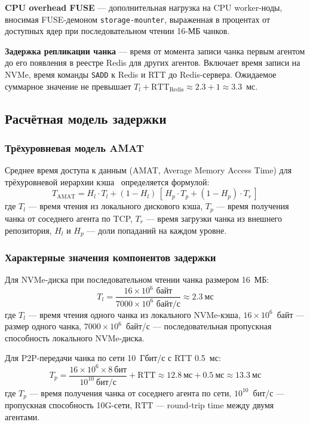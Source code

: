 \textbf{CPU overhead FUSE} --- дополнительная нагрузка на CPU worker-ноды, вносимая FUSE-демоном \texttt{storage-mounter}, выраженная в процентах от доступных ядер при последовательном чтении 16-МБ чанков.

\textbf{Задержка репликации чанка} --- время от момента записи чанка первым агентом до его появления в реестре Redis для других агентов. Включает время записи на NVMe, время команды \texttt{SADD} к Redis и RTT до Redis-сервера. Ожидаемое суммарное значение не превышает $T_l + \mathrm{RTT_{Redis}} \approx 2.3 + 1 \approx 3.3$~мс.

\subsection{Расчётная модель задержки}

\subsubsection{Трёхуровневая модель AMAT}

Среднее время доступа к данным (AMAT, Average Memory Access Time) для трёхуровневой иерархии кэша~\cite{hennessy2011ca} определяется формулой:
\begin{equation}
  T_{\mathrm{AMAT}} = H_l \cdot T_l + (1 - H_l)\,[\,H_p \cdot T_p + (1 - H_p) \cdot T_r\,]
  \label{eq:amat-evaluation}
\end{equation}
где $T_l$ --- время чтения из локального дискового кэша, $T_p$ --- время получения чанка от соседнего агента по TCP, $T_r$ --- время загрузки чанка из внешнего репозитория, $H_l$ и $H_p$ --- доли попаданий на каждом уровне.

\subsubsection{Характерные значения компонентов задержки}

Для NVMe-диска при последовательном чтении чанка размером 16~МБ:
\begin{equation}
  T_l = \frac{16 \times 10^6 \text{ байт}}{7000 \times 10^6 \text{ байт/с}} \approx 2.3~\text{мс}
\end{equation}
где $T_l$ --- время чтения одного чанка из локального NVMe-кэша, $16 \times 10^6$~байт --- размер одного чанка, $7000 \times 10^6$~байт/с --- последовательная пропускная способность локального NVMe-диска.

Для P2P-передачи чанка по сети 10~Гбит/с с RTT 0.5~мс:
\begin{equation}
  T_p = \frac{16 \times 10^6 \times 8~\text{бит}}{10^{10}~\text{бит/с}} + \mathrm{RTT} \approx 12.8~\text{мс} + 0.5~\text{мс} \approx 13.3~\text{мс}
\end{equation}
где $T_p$ --- время получения чанка от соседнего агента по сети, $10^{10}$~бит/с --- пропускная способность 10G-сети, $\mathrm{RTT}$ --- round-trip time между двумя агентами.

